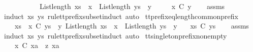 \ \ \ \ \ \ \ \ \ \ {\isachardoublequoteopen}List{\isachardot}length\ {\isacharparenleft}xs\ {\isacharat}\ {\isacharbrackleft}x{\isacharbrackright}{\isacharparenright}\ {\isacharequal}\ List{\isachardot}length\ {\isacharparenleft}ys\ {\isacharat}\ {\isacharbrackleft}y{\isacharbrackright}{\isacharparenright}{\isachardoublequoteclose}\isanewline
\ \ \ \ \ {\isachardoublequoteopen}{\isacharbrackleft}x{\isacharbrackright}\ {\isasymlesssim}\isactrlsub C\ {\isacharbrackleft}y{\isacharbrackright}{\isachardoublequoteclose}\isanewline
%
\isadelimproof
\ \ %
\endisadelimproof
%
\isatagproof
{}\isamarkupfalse%
\ assms\ \isamarkupfalse%
{\isacharparenleft}induct\ xs\ ys\ rule{\isacharcolon}tt{\isacharunderscore}prefix{\isacharunderscore}subset{\isachardot}induct{\isacharcomma}\ auto{\isacharparenright}%
\endisatagproof
{\isafoldproof}%
%
\isadelimproof
\isanewline
%
\endisadelimproof
\isanewline
{}\isamarkupfalse%
\ tt{\isacharunderscore}prefix{\isacharunderscore}eq{\isacharunderscore}length{\isacharunderscore}common{\isacharunderscore}prefix{\isacharcolon}\isanewline
\ \ \ {\isachardoublequoteopen}xs\ {\isacharat}\ {\isacharbrackleft}x{\isacharbrackright}\ {\isasymlesssim}\isactrlsub C\ ys\ {\isacharat}\ {\isacharbrackleft}y{\isacharbrackright}{\isachardoublequoteclose}\ {\isachardoublequoteopen}List{\isachardot}length\ {\isacharparenleft}xs\ {\isacharat}\ {\isacharbrackleft}x{\isacharbrackright}{\isacharparenright}\ {\isacharequal}\ List{\isachardot}length\ {\isacharparenleft}ys\ {\isacharat}\ {\isacharbrackleft}y{\isacharbrackright}{\isacharparenright}{\isachardoublequoteclose}\isanewline
\ \ \ {\isachardoublequoteopen}xs\ {\isasymlesssim}\isactrlsub C\ ys{\isachardoublequoteclose}\isanewline
%
\isadelimproof
\ \ %
\endisadelimproof
%
\isatagproof
{}\isamarkupfalse%
\ assms\ \isamarkupfalse%
{\isacharparenleft}induct\ xs\ ys\ rule{\isacharcolon}tt{\isacharunderscore}prefix{\isacharunderscore}subset{\isachardot}induct{\isacharcomma}\ auto{\isacharparenright}%
\endisatagproof
{\isafoldproof}%
%
\isadelimproof
\isanewline
%
\endisadelimproof
\isanewline
{}\isamarkupfalse%
\ tt{\isacharunderscore}singleton{\isacharunderscore}prefix{\isacharunderscore}nonempty{\isacharcolon}\isanewline
\ \ \ {\isachardoublequoteopen}{\isacharbrackleft}x{\isacharbrackright}\ {\isasymlesssim}\isactrlsub C\ xa\ {\isacharat}\ z{\isachardoublequoteclose}\ {\isachardoublequoteopen}xa\ {\isasymnoteq}\ {\isacharbrackleft}{\isacharbrackright}{\isachardoublequoteclose}\isanewline
